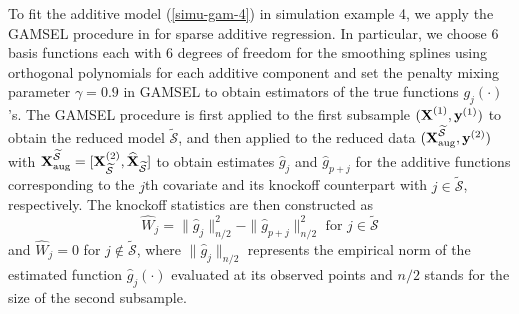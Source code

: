 \documentclass[11pt]{article}
\newcommand{\by}{\mbox{\bf y}}
\newcommand{\bX}{\mbox{\bf X}}
\newcommand{\bbeta}{\mbox{\boldmath $\beta$}}
\newcommand{\wt}{\widetilde}
\newcommand{\wh}{\widehat}
\newcommand{\hbbeta}{\widehat\bbeta}
\newcommand{\hbeta}{\widehat{\beta}}
\def\t{^T}
\begin{document}
 To fit the additive model (\ref{simu-gam-4}) in simulation example 4, we apply the GAMSEL procedure in \cite{Chouldechova2015} for sparse additive regression. In particular, we choose 6 basis functions each with 6 degrees of freedom for the smoothing splines using orthogonal polynomials
for each additive component and set the penalty mixing parameter $\gamma= 0.9$ in GAMSEL to obtain estimators of the true functions $g_j(\cdot)$'s. The GAMSEL procedure is first applied to the first subsample $(\bX^{(1)}, \by^{(1)})$ to obtain the reduced model $\wt{\mathcal S}$, and then applied to the reduced data   $(\bX_{\rm aug}^{\wt{\mathcal S}},  \by^{(2)})$ with $ \bX_{\rm aug}^{\wt{\mathcal S}} = [\bX_{\wt{\mathcal S}}^{(2)}, {\wh{\bX}}_{\wt{\mathcal S}}]$ to obtain estimates  $\widehat{g}_j$ and $\widehat{g}_{p+j}$ for the additive functions corresponding to the $j$th covariate and its knockoff counterpart with $j\in \wt{\mathcal {S}}$,  respectively. The  knockoff statistics are then constructed as
\begin{equation} \label{neweq003}
\wh{W}_j = \|\widehat{g}_j\|_{n/2}^2-\|\widehat{g}_{p+j}\|_{n/2}^2 \text{ for } j\in \wt{\mathcal S}
\end{equation}
and $\wh{W}_j  = 0$ for $j\not\in \wt{\mathcal S}$, where $\|\widehat{g}_j\|_{n/2}$ represents the empirical norm of the estimated function $\widehat{g}_j(\cdot)$ evaluated at its observed points and $n/2$ stands for the size of the second subsample.
%
\end{document}
